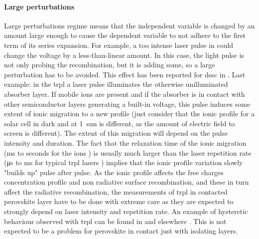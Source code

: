 		\paragraph{Large perturbations} \label{perturbation}
		Large perturbations regime means that the independent variable is changed by an amount large enough to cause the dependent variable to not adhere to the first term of its series expansion.
		For example, a too intense laser pulse in  could change the voltage by a less\hyp{}than\hyp{}linear amount.
		In this case, the light pulse is not only probing the recombination, but it is adding some, so a large perturbation has to be avoided.
		This effect has been reported for \gls{dssc} in .
		Last example: in the \glsdesc{trpl} a laser pulse illuminates the otherwise unilluminated absorber layer.
		If mobile ions are present and if the absorber is in contact with other semiconductor layers generating a built-in voltage, this pulse induces some extent of ionic migration to a new profile \cite{Levine2018} (just consider that the ionic profile for a solar cell in dark and at \SI{1}{sun} is different, as the amount of electric field to screen is different).
		The extent of this migration will depend on the pulse intensity and duration.
		The fact that the relaxation time of the ionic migration (\si{\ms} to seconds for the ions \cite{Jacobs2018}) is usually much larger than the laser repetition rate (\si{\us} to \si{\ms} for typical \gls{trpl} lasers \cite{EdinburghInstruments}) implies that the ionic profile variation slowly "builds up" pulse after pulse.
		As the ionic profile affects the free charges concentration profile and non radiative surface recombination, and these in turn affect the radiative recombination, the measurements of \gls{trpl} in contacted perovskite layer have to be done with extreme care as they are expected to strongly depend on laser intensity and repetition rate.
		An example of hysteretic behaviour observed with \gls{trpl} can be found in  and elsewhere \cite{Chen2015,Chen2017}.
		This is not expected to be a problem for perovskite in contact just with isolating layers.


